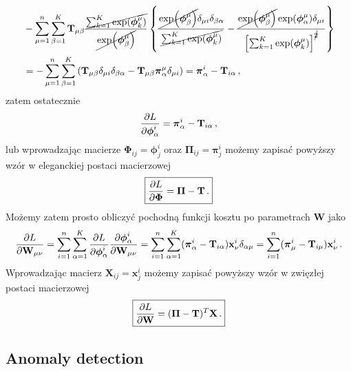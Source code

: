 \documentclass{myclass}
\numberwithin{equation}{subsection}
\begin{document}
\begin{equation}
    \begin{split}
        &-\sum_{\mu=1}^n\sum_{\beta=1}^K \mathbf{T}_{\mu\beta} \frac{\cancel{\sum_{k=1}^K \exp(\boldsymbol{\phi}^\mu_k)}}{\cancel{\exp(\boldsymbol{\phi}^\mu_\beta)}} \left\{\frac{\cancel{\exp(\boldsymbol{\phi}_\beta^\mu)}\delta_{\mu i}\delta_{\beta \alpha}}{\cancel{\sum_{k=1}^K \exp(\boldsymbol{\phi}_k^\mu)}} - \frac{\cancel{\exp(\boldsymbol{\phi}_\beta^\mu)} \exp(\boldsymbol{\phi}^\mu_\alpha) \delta_{\mu i}}{\left[\sum_{k=1}^K \exp(\boldsymbol{\phi}_k^\mu)\right]^{\cancel{2}}}\right\}\\
        &= -\sum_{\mu=1}^n\sum_{\beta=1}^K \left(\mathbf{T}_{\mu\beta} \delta_{\mu i}\delta_{\beta\alpha} - \mathbf{T}_{\mu\beta}\boldsymbol{\pi}^\mu_\alpha\delta_{\mu i}\right) = \boldsymbol{\pi}_\alpha^i - \mathbf{T}_{i\alpha}\,,
    \end{split}
\end{equation}
zatem ostatecznie
\begin{equation}
    \pdv{L}{\boldsymbol{\phi}_\alpha^i} = \boldsymbol{\pi}_\alpha^i - \mathbf{T}_{i\alpha}\,,
\end{equation}
lub wprowadzając macierze \(\boldsymbol{\Phi}_{ij} = \boldsymbol{\phi}^i_j\) oraz
\(\boldsymbol{\Pi}_{ij} = \boldsymbol{\pi}^i_j\) możemy zapisać powyższy wzór w eleganckiej postaci
macierzowej
\begin{equation}\boxed{
    \pdv{L}{\boldsymbol{\Phi}} = \boldsymbol{\Pi} - \mathbf{T}\,.
}\end{equation}
Możemy zatem prosto obliczyć pochodną funkcji kosztu po parametrach \(\mathbf{W}\) jako
\begin{equation}
    \pdv{L}{\mathbf{W}_{\mu\nu}} = \sum_{i=1}^n \sum_{\alpha=1}^{K} \pdv{L}{\boldsymbol{\phi}_\alpha^i}\pdv{\boldsymbol{\phi}_\alpha^i}{\mathbf{W}_{\mu\nu}} = \sum_{i=1}^n \sum_{\alpha=1}^{K} (\boldsymbol{\pi}_\alpha^i - \mathbf{T}_{i\alpha}) \mathbf{x}^i_\nu \delta_{\alpha \mu} = \sum_{i=1}^n (\boldsymbol{\pi}_\mu^i - \mathbf{T}_{i\mu})\mathbf{x}^i_\nu\,.
\end{equation}
Wprowadzając macierz \(\mathbf{X}_{ij} = \mathbf{x}^i_j\) możemy zapisać powyższy wzór w zwięzłej
postaci macierzowej
\begin{equation}\boxed{
    \pdv{L}{\mathbf{W}} = (\boldsymbol{\Pi} - \mathbf{T})^T \mathbf{X}\,.
}\end{equation}


\subsection{Anomaly detection}
\end{document}
